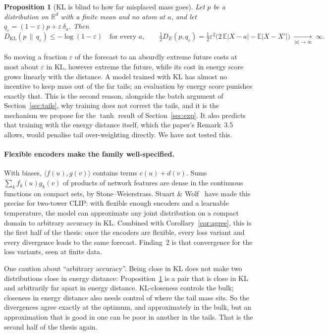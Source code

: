 \documentclass[11pt]{article}
\newcommand{\KL}{D_{\mathrm{KL}}}
\newcommand{\E}{\mathbb{E}}
\newcommand{\R}{\mathbb{R}}
\theoremstyle{plain}
\newtheorem{proposition}{Proposition}
\theoremstyle{definition}
\theoremstyle{remark}
\begin{document}
\begin{proposition}[KL is blind to how far misplaced mass goes]\label{prop:farmass}
Let $p$ be a distribution on $\R^d$ with a finite mean and no atom at $a$, and let
$q_\varepsilon=(1-\varepsilon)p+\varepsilon\,\delta_a$. Then
\[
  \KL(p\,\|\,q_\varepsilon)\le-\log(1-\varepsilon)\quad\text{for every } a,
  \qquad
  \tfrac12 D_E(p,q_\varepsilon)=\tfrac12\varepsilon^2\big(2\,\E|X-a|-\E|X-X'|\big)\;\xrightarrow[|a|\to\infty]{}\;\infty .
\]
\end{proposition}

So moving a fraction $\varepsilon$ of the forecast to an absurdly extreme future costs at most about
$\varepsilon$ in KL, however extreme the future, while its cost in energy score grows linearly
with the distance. A model trained with KL has almost no incentive to keep mass out of the far
tails; an evaluation by energy score punishes exactly that. This is the second reason,
alongside the batch argument of Section~\ref{sec:tails}, why training does not correct the
tails, and it is the mechanism we propose for the $\tanh$ result of Section~\ref{sec:exp}.
It also predicts that training with the energy distance itself, which the paper's
Remark~3.5 allows, would penalise tail over-weighting directly. We have not tested this.

\paragraph{Flexible encoders make the family well-specified.} With biases, $\langle f(u),g(v)\rangle$
contains terms $c(u)+d(v)$. Sums $\sum_k f_k(u)g_k(v)$ of products of network features are
dense in the continuous functions on compact sets, by Stone--Weierstrass. Stuart \&
Wolf~\cite{stuartwolf} have made this precise for two-tower CLIP: with flexible enough
encoders and a learnable temperature, the model can approximate any joint distribution on
a compact domain to arbitrary accuracy in KL. Combined with Corollary~\ref{cor:agree}, this is
the first half of the thesis: once the encoders are flexible, every loss variant and every
divergence leads to the same forecast. Finding~2 is that convergence for the loss variants,
seen at finite data.

One caution about ``arbitrary accuracy''. Being close in KL does not make two distributions
close in energy distance: Proposition~\ref{prop:farmass} is a pair that is close in KL and
arbitrarily far apart in energy distance. KL-closeness controls the bulk; closeness in energy
distance also needs control of where the tail mass sits. So the divergences agree exactly at
the optimum, and approximately in the bulk, but an approximation that is good in one can be
poor in another in the tails. That is the second half of the thesis again.
\end{document}
